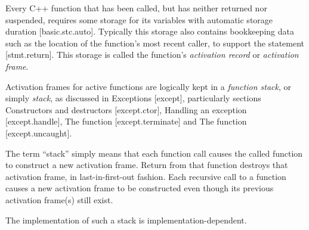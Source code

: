 
Every C++ function that has been called, but has neither returned nor
suspended, requires some storage for its variables with automatic storage
duration [basic.stc.auto]. Typically this storage also contains bookkeeping
data such as the location of the function's most recent caller, to support
the  statement [stmt.return]. This storage is called the
function's \emph{activation record} or \emph{activation frame}.

Activation frames for active functions are logically kept in a \emph{function
stack}, or simply \emph{stack}, as discussed in Exceptions [except],
particularly sections Constructors and destructors [except.ctor], Handling an
exception [except.handle], The \termn function
[except.terminate] and The \uncexs function
[except.uncaught].

The term ``stack'' simply means that each function call causes the called
function to construct a new activation frame. Return from that function
destroys that activation frame, in last-in-first-out fashion. Each recursive
call to a function causes a new activation frame to be constructed even though
its previous activation frame(s) still exist.

The implementation of such a stack is implementation-dependent.
